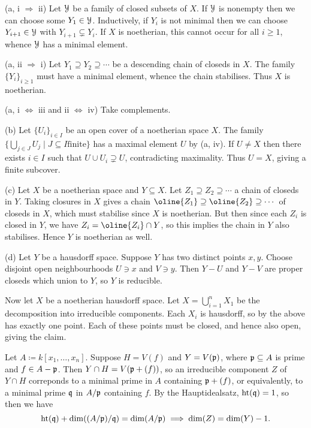 \begin{nothing}
  (a, i $\Rightarrow$ ii) Let $\mathcal{Y}$ be a family of closed subsets of
  $X$. If $\mathcal{Y}$ is nonempty then we can choose some $Y_1 \in
  \mathcal{Y}$. Inductively, if $Y_i$ is not minimal then we can choose
  $Y_{i+1} \in \mathcal{Y}$ with $Y_{i+1} \subsetneq Y_i$. If $X$ is
  noetherian, this cannot occur for all $i \ge 1$, whence $\mathcal{Y}$ has a
  minimal element.

  \medskip\noindent
  (a, ii $\Rightarrow$ i) Let $Y_1 \supseteq Y_2 \supseteq \cdots$ be
  a descending chain of closeds in $X$. The family $\{Y_i\}_{i \ge 1}$
  must have a minimal element, whence the chain stabilises. Thus $X$
  is noetherian.

  \medskip\noindent
  (a, i $\Leftrightarrow$ iii and ii $\Leftrightarrow$ iv) Take
  complements.

  \medskip\noindent
  (b) Let $\{U_i\}_{i \in I}$ be an open cover of a noetherian space
  $X$. The family $\{\bigcup_{j \in J} U_j \mid J \subseteq I \text{
    finite}\}$ has a maximal element $U$ by (a, iv). If $U \ne X$ then
  there exists $i \in I$ such that $U \cup U_i \supsetneq U$,
  contradicting maximality. Thus $U = X$, giving a finite subcover.

  \medskip\noindent
  (c) Let $X$ be a noetherian space and $Y \subseteq X$. Let $Z_1
  \supseteq Z_2\supseteq \cdots$ a chain of closeds in $Y$. Taking
  closures in $X$ gives a chain $\oline{Z_1} \supseteq \oline{Z_2}
  \supseteq \cdots$ of closeds in $X$, which must stabilise since $X$
  is noetherian. But then since each $Z_i$ is closed in $Y$, we have
  $Z_i = \oline{Z_i} \cap Y$, so this implies the chain in $Y$ also
  stabilises. Hence $Y$ is noetherian as well.

  \medskip\noindent
  (d) Let $Y$ be a hausdorff space. Suppose $Y$ has two distinct
  points $x,y$. Choose disjoint open neighbourhoods $U \ni x$ and $V
  \ni y$. Then $Y-U$ and $Y-V$ are proper closeds which union to
  $Y$, so $Y$ is reducible.

  Now let $X$ be a noetherian hausdorff space. Let $X =
  \bigcup_{i=1}^n X_1$ be the decomposition into irreducible
  components. Each $X_i$ is hausdorff, so by the above has exactly one
  point. Each of these points must be closed, and hence also open,
  giving the claim.
\end{nothing}

\begin{nothing}
  Let $A \coloneqq k[x_1,\ldots,x_n]$. Suppose $H = V(f)$ and $Y =
  V(\mathfrak{p})$, where $\mathfrak{p} \subseteq A$ is prime and $f \in A - \mathfrak{p}$. Then $Y
  \cap H = V(\mathfrak{p} + (f))$, so an irreducible component $Z$ of $Y \cap H$
  correponds to a minimal prime in $A$ containing $\mathfrak{p} + (f)$, or
  equivalently, to a minimal prime $\mathfrak{q}$ in $A/\mathfrak{p}$ containing $f$. By
  the Hauptidealsatz, $\operatorname{ht}(\mathfrak{q}) = 1$, so then we have
  \[
  \operatorname{ht}(\mathfrak{q}) + \dim((A/\mathfrak{p})/\mathfrak{q}) = \dim(A/\mathfrak{p}) \implies \dim(Z) =
  \dim(Y) - 1.
  \]
\end{nothing}

